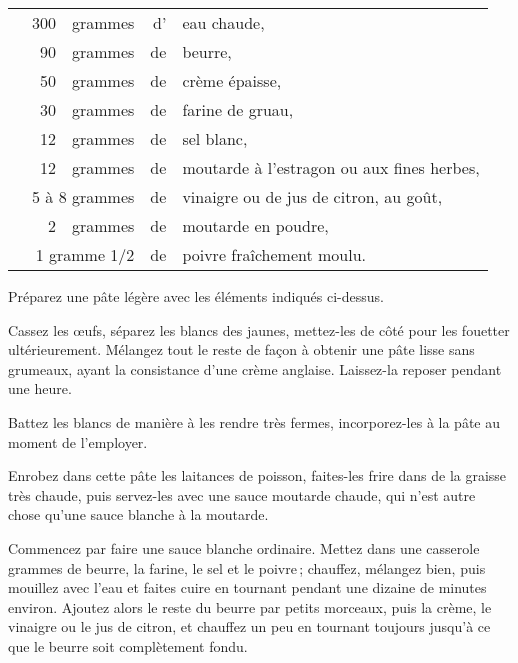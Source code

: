 \footnotesize
\begin{longtable}{rrrrp{16em}}
  & 300 & grammes & d' & eau chaude,                                                                      \\
  &  90 & grammes & de & beurre,                                                                          \\
  &  50 & grammes & de & crème épaisse,                                                                   \\
  &  30 & grammes & de & farine de gruau,                                                                 \\
  &  12 & grammes & de & sel blanc,                                                                       \\
  &  12 & grammes & de & moutarde à l'estragon ou aux fines herbes,                                       \\
  & \multicolumn{2}{r}{5 à 8 grammes} & de & vinaigre ou de jus de citron, au goût,                       \\
  &   2 & grammes & de & moutarde en poudre,                                                              \\
  & \multicolumn{2}{r}{1 gramme 1/2 } & de & poivre fraîchement moulu.                                    \\
\end{longtable}
\normalsize

Préparez une pâte légère avec les éléments indiqués ci-dessus.

Cassez les œufs, séparez les blancs des jaunes, mettez-les de côté pour les
fouetter ultérieurement. Mélangez tout le reste de façon à obtenir une pâte
lisse sans grumeaux, ayant la consistance d'une crème anglaise. Laissez-la
reposer pendant une heure.

Battez les blancs de manière à les rendre très fermes, incorporez-les à la pâte
au moment de l'employer.

Enrobez dans cette pâte les laitances de poisson, faites-les frire dans de la
graisse très chaude, puis servez-les avec une sauce moutarde chaude, qui n'est
autre chose qu'une sauce blanche à la moutarde.

\sk

Commencez par faire une sauce blanche ordinaire. Mettez dans une casserole
{\mmm} grammes de beurre, la farine, le sel et le poivre ; chauffez,
mélangez bien, puis mouillez avec l’eau et faites cuire en tournant pendant une
dizaine de minutes environ. Ajoutez alors le reste du beurre par petits
morceaux, puis la crème, le vinaigre ou le jus de citron, et chauffez un peu en
tournant toujours jusqu'à ce que le beurre soit complètement fondu.

